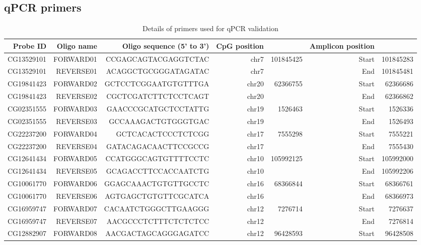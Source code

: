 \subsection{qPCR primers}

\begin{table}[htbp]
  \tiny
  \texttt
  \centering
  \caption{Details of primers used for qPCR validation}
    \begin{tabular}{rrrrrrr}
    \toprule
    Probe ID & Oligo name & Oligo sequence (5' to 3') & CpG position &       & Amplicon position &  \\
    \midrule
    CG13529101 & FORWARD01 & CCGAGCAGTACGAGGTCTAC & chr7  & 101845425 & Start & 101845283 \\
    CG13529101 & REVERSE01 & ACAGGCTGCGGGATAGATAC & chr7  &       & End   & 101845481 \\
    CG19841423 & FORWARD02 & GCTCCTCGGAATGTGTTTGA & chr20 & 62366755 & Start & 62366686 \\
    CG19841423 & REVERSE02 & CGCTCGATCTTCTCCTCAGT & chr20 &       & End   & 62366862 \\
    CG02351555 & FORWARD03  & GAACCCGCATGCTCCTATTG & chr19 & 1526463 & Start & 1526336 \\
    CG02351555 & REVERSE03 & GCCAAAGACTGTGGGTGAC & chr19 &       & End   & 1526493 \\
    CG22237200 & FORWARD04 & GCTCACACTCCCTCTCGG & chr17 & 7555298 & Start & 7555221 \\
    CG22237200 & REVERSE04 & GATACAGACAACTTCCGCCG & chr17 &       & End   & 7555430 \\
    CG12641434 & FORWARD05 & CCATGGGCAGTGTTTTCCTC & chr10 & 105992125 & Start & 105992000 \\
    CG12641434 & REVERSE05 & GCAGACCTTCCACCAATCTG & chr10 &       & End   & 105992206 \\
    CG10061770 & FORWARD06 & GGAGCAAACTGTGTTGCCTC & chr16 & 68366844 & Start & 68366761 \\
    CG10061770 & REVERSE06 & AGTGAGCTGTGTTCGCATCA & chr16 &       & End   & 68366973 \\
    CG16959747 & FORWARD07 & CACAATCTGGGCTTGAAGGG & chr12 & 7276714 & Start & 7276637 \\
    CG16959747 & REVERSE07 & AACGCCCTCTTTCTCTCTCC & chr12 &       & End   & 7276814 \\
    CG12882907 & FORWARD08 & AACGACTAGCAGGGAGATCC & chr12 & 96428593 & Start & 96428508 \\

\end{tabular}
\end{table}
